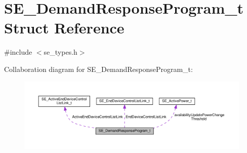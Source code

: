 \hypertarget{structSE__DemandResponseProgram__t}{}\section{S\+E\+\_\+\+Demand\+Response\+Program\+\_\+t Struct Reference}
\label{structSE__DemandResponseProgram__t}


{\ttfamily \#include $<$se\+\_\+types.\+h$>$}



Collaboration diagram for S\+E\+\_\+\+Demand\+Response\+Program\+\_\+t\+:\nopagebreak
\begin{figure}[H]
\begin{center}
\leavevmode
\includegraphics[width=350pt]{structSE__DemandResponseProgram__t__coll__graph}
\end{center}
\end{figure}
